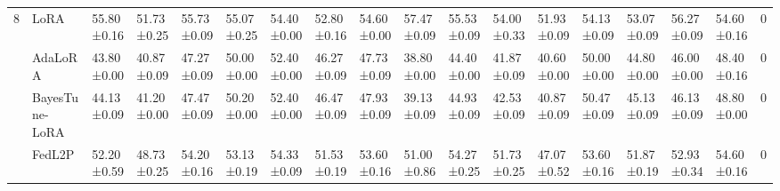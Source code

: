 \begin{table*}[]
\begin{scriptsize}
{\begin{tabular}{c|l|l|l|l|l|l|l|l|l|l|l|l|l|l|l|l|c}
\multirow{5}{*}{8}  & LoRA                                   & 55.80±0.16                        & 51.73±0.25                       & 55.73±0.09                       & 55.07±0.25                       & 54.40±0.00                        & 52.80±0.16                        & 54.60±0.00                        & 57.47±0.09                       & 55.53±0.09                       & 54.00±0.33                        & 51.93±0.09                       & 54.13±0.09                       & 53.07±0.09                       & 56.27±0.09                       & 54.60±0.16                        & 0             \\ %
                    & AdaLoRA                              & 43.80±0.00                        & 40.87±0.09                       & 47.27±0.09                       & 50.00±0.00                        & 52.40±0.00                        & 46.27±0.09                       & 47.73±0.09                       & 38.80±0.00                        & 44.40±0.00                        & 41.87±0.09                       & 40.60±0.00                        & 50.00±0.00                        & 44.80±0.00                        & 46.00±0.00                        & 48.40±0.16                        & 0             \\ %
                    & BayesTune-LoRA                            & 44.13±0.09                       & 41.20±0.00                        & 47.47±0.09                       & 50.20±0.00                        & 52.40±0.00                        & 46.47±0.09                       & 47.93±0.09                       & 39.13±0.09                       & 44.93±0.09                       & 42.53±0.09                       & 40.87±0.09                       & 50.47±0.09                       & 45.13±0.09                       & 46.13±0.09                       & 48.80±0.00                        & 0             \\ %
                    & FedL2P                               & 52.20±0.59                        & 48.73±0.25                       & 54.20±0.16                        & 53.13±0.19                       & 54.33±0.09                       & 51.53±0.19                       & 53.60±0.16                        & 51.00±0.86                        & 54.27±0.25                       & 51.73±0.25                       & 47.07±0.52                       & 53.60±0.16                        & 51.87±0.19                       & 52.93±0.34                       & 54.60±0.16                        & 0             \\ %

\end{tabular}}
\end{scriptsize}
\end{table*}
